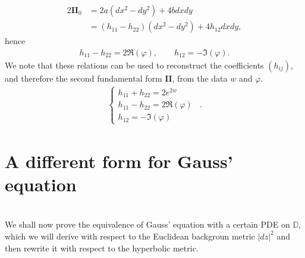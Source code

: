 \documentclass[a4paper,11pt,openright,twoside]{book}
\newcommand{\II}{\mathbf{I\!I}}
\newcommand{\1}{\mathds{1}}
\theoremstyle{plain}
\theoremstyle{definition}
\theoremstyle{remark}
\begin{document}
\begin{align*}
	2\II_0
	&=2a(dx^2-dy^2)+4bdxdy\\
	&=(h_{11}-h_{22})(dx^2-dy^2)+4h_{12}dxdy,
\end{align*}
hence
\begin{align*}
	h_{11}-h_{22}=2\Re(\varphi),
	\qquad
	h_{12}=-\Im(\varphi).
\end{align*}
We note that these relations can be used to reconstruct the coefficients $(h_{ij})$, and therefore the second fundamental form $\II$, from the data $w$ and $\varphi$. 
\begin{align}\label{eq:gausspde1}
	\begin{cases}
		h_{11}+h_{22} = 2e^{2w}\\
		h_{11}-h_{22} =  2\Re(\varphi)\\
		h_{12}   = -\Im(\varphi)
	\end{cases}
\ \ .
\end{align}

\section{A different form for Gauss' equation}\label{sc:geq}\mbox{}\\
We shall now prove the equivalence of Gauss' equation with a certain PDE on $\mathbb{D}$, which we will derive with respect to the Euclidean backgroun metric $|dz|^2$ and then rewrite it with respect to the hyperbolic metric.\\
\end{document}

